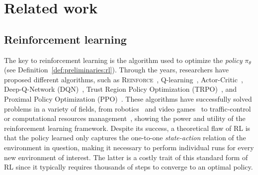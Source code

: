 \section{Related work}\label{sec:related}


\subsection{Reinforcement learning}\label{sec:related:rl}

The key to reinforcement learning is the algorithm used to optimize the \textit{policy} $\pi_\theta$ (see Definition~\ref{def:preliminaries:rl}). Through the years, researchers have proposed different algorithms, such as \textsc{Reinforce}~\citep{Reinforce}, Q-learning~\citep{Qlearning}, Actor-Critic~\citep{ActorCritic}, Deep-Q-Network (DQN)~\citep{DQN}, Trust Region Policy Optimization (TRPO)~\citep{TRPO}, and Proximal Policy Optimization (PPO)~\citep{PPO}. These algorithms have successfully solved problems in a variety of fields, from robotics~\citep{RLRobotics} and video games~\citep{MonteCarlo, DQN} to traffic-control~\citep{RLTraffic} or computational resources management~\citep{RLresourcemanagement}, showing the power and utility of the reinforcement learning framework. Despite its success, a theoretical flaw of RL is that the policy learned only captures the one-to-one \textit{state-action} relation of the environment in question, making it necessary to perform individual runs for every new environment of interest. The latter is a costly trait of this standard form of RL since it typically requires thousands of steps to converge to an optimal policy.


